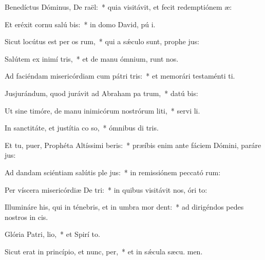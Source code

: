 \item Benedíctus Dóminus, De raël:~* quia visitávit, et fecit redemptiónem  æ:
\item Et eréxit cornu salú bis:~* in domo David, pú i.
\item Sicut locútus est per os rum,~* qui a sǽculo sunt, prophe jus:
\item Salútem ex inimí tris,~* et de manu ómnium,  runt nos.
\item Ad faciéndam misericórdiam cum pátri tris:~* et memorári testaménti  ti.
\item Jusjurándum, quod jurávit ad Abraham pa trum,~* datú  bis:
\item Ut sine timóre, de manu inimicórum nostrórum liti,~* servi li.
\item In sanctitáte, et justítia co so,~* ómnibus di tris.
\item Et tu, puer, Prophéta Altíssimi beris:~* præíbis enim ante fáciem Dómini, paráre  jus:
\item Ad dandam sciéntiam salútis ple jus:~* in remissiónem peccató rum:
\item Per víscera misericórdiæ De tri:~* in quibus visitávit nos, óri  to:
\item Illumináre his, qui in ténebris, et in umbra mor dent:~* ad dirigéndos pedes nostros in  cis.
\item Glória Patri,  lio,~* et Spirí to.
\item Sicut erat in princípio, et nunc,  per,~* et in sǽcula sæcu. men.
